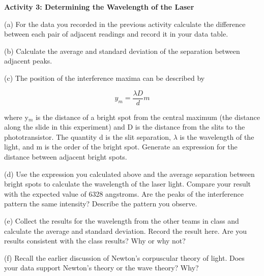 \textbf{Activity 3: Determining the Wavelength of the Laser }

(a) For the data you recorded in the previous activity calculate the
difference between each pair of adjacent readings and record
it in your data table.

(b) Calculate the average and standard deviation of the separation between 
adjacent peaks.
\vspace{15mm}

(c) The position of the interference maxima can be described by

\[
y_{m}=\frac{\lambda D}{d}m\]


where y\( _{m} \) is the distance of a bright spot from the central
maximum (the distance along the slide in this experiment) and D is
the distance from the slits to the phototransistor. The quantity d
is the slit separation, \( \lambda  \) is the wavelength of the light,
and m is the order of the bright spot. Generate an expression for
the distance between adjacent bright spots.
\vspace{15mm}

(d) Use the expression you calculated above and the average separation
between bright spots to calculate the wavelength of the laser light.
Compare your result with the expected value of 6328 angstroms. Are
the peaks of the interference pattern the same intensity? Describe
the pattern you observe.
\vspace{30mm}

\newpage

(e) Collect the results for the wavelength from the other teams in class
and calculate the average and standard deviation. Record the result here.
Are you results consistent with the class results? Why or why not?
\vspace{30mm}

(f) Recall the earlier discussion of Newton's corpuscular theory of
light. Does your data support Newton's theory or the wave theory?
Why?\vspace{15mm}

